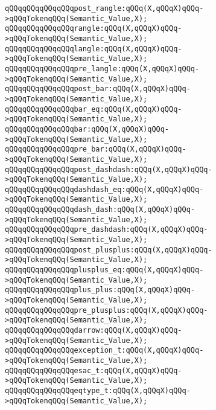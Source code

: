 \verb|qQQqqQQqqQQqqQQqpost_rangle:qQQq(X,qQQqX)qQQq->qQQqTokenqQQq(Semantic_Value,X);|\newline
\verb|qQQqqQQqqQQqqQQqrangle:qQQq(X,qQQqX)qQQq->qQQqTokenqQQq(Semantic_Value,X);|\newline
\verb|qQQqqQQqqQQqqQQqlangle:qQQq(X,qQQqX)qQQq->qQQqTokenqQQq(Semantic_Value,X);|\newline
\verb|qQQqqQQqqQQqqQQqpre_langle:qQQq(X,qQQqX)qQQq->qQQqTokenqQQq(Semantic_Value,X);|\newline
\verb|qQQqqQQqqQQqqQQqpost_bar:qQQq(X,qQQqX)qQQq->qQQqTokenqQQq(Semantic_Value,X);|\newline
\verb|qQQqqQQqqQQqqQQqbar_eq:qQQq(X,qQQqX)qQQq->qQQqTokenqQQq(Semantic_Value,X);|\newline
\verb|qQQqqQQqqQQqqQQqbar:qQQq(X,qQQqX)qQQq->qQQqTokenqQQq(Semantic_Value,X);|\newline
\verb|qQQqqQQqqQQqqQQqpre_bar:qQQq(X,qQQqX)qQQq->qQQqTokenqQQq(Semantic_Value,X);|\newline
\verb|qQQqqQQqqQQqqQQqpost_dashdash:qQQq(X,qQQqX)qQQq->qQQqTokenqQQq(Semantic_Value,X);|\newline
\verb|qQQqqQQqqQQqqQQqdashdash_eq:qQQq(X,qQQqX)qQQq->qQQqTokenqQQq(Semantic_Value,X);|\newline
\verb|qQQqqQQqqQQqqQQqdash_dash:qQQq(X,qQQqX)qQQq->qQQqTokenqQQq(Semantic_Value,X);|\newline
\verb|qQQqqQQqqQQqqQQqpre_dashdash:qQQq(X,qQQqX)qQQq->qQQqTokenqQQq(Semantic_Value,X);|\newline
\verb|qQQqqQQqqQQqqQQqpost_plusplus:qQQq(X,qQQqX)qQQq->qQQqTokenqQQq(Semantic_Value,X);|\newline
\verb|qQQqqQQqqQQqqQQqplusplus_eq:qQQq(X,qQQqX)qQQq->qQQqTokenqQQq(Semantic_Value,X);|\newline
\verb|qQQqqQQqqQQqqQQqplus_plus:qQQq(X,qQQqX)qQQq->qQQqTokenqQQq(Semantic_Value,X);|\newline
\verb|qQQqqQQqqQQqqQQqpre_plusplus:qQQq(X,qQQqX)qQQq->qQQqTokenqQQq(Semantic_Value,X);|\newline
\verb|qQQqqQQqqQQqqQQqdarrow:qQQq(X,qQQqX)qQQq->qQQqTokenqQQq(Semantic_Value,X);|\newline
\verb|qQQqqQQqqQQqqQQqexception_t:qQQq(X,qQQqX)qQQq->qQQqTokenqQQq(Semantic_Value,X);|\newline
\verb|qQQqqQQqqQQqqQQqesac_t:qQQq(X,qQQqX)qQQq->qQQqTokenqQQq(Semantic_Value,X);|\newline
\verb|qQQqqQQqqQQqqQQqeqtype_t:qQQq(X,qQQqX)qQQq->qQQqTokenqQQq(Semantic_Value,X);|\newline

